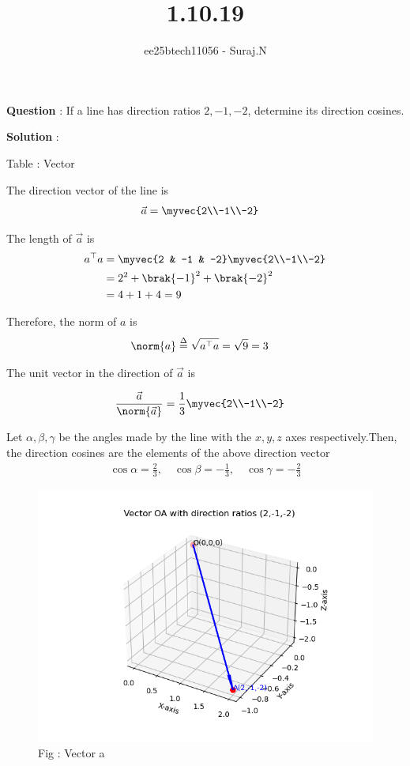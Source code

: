 \documentclass[journal,12pt,onecolumn]{IEEEtran}
\theoremstyle{remark}
\begin{document}
\title{1.10.19}
\author{ee25btech11056 - Suraj.N}
\maketitle
\renewcommand{\thefigure}{\theenumi}
\renewcommand{\thetable}{\theenumi}

\textbf{Question} : If a line has direction ratios $2,-1,-2$, determine its direction cosines. 

\textbf{Solution} : 

\begin{table}[h!]
  \centering
  
  \caption*{Table : Vector}
  \label{1.10.19}
\end{table}

The direction vector of the line is
\begin{align*}
\vec{a} &= \myvec{2\\-1\\-2}
\end{align*}

The length of $\vec{a}$ is
\begin{align*}
a^\top a &= \myvec{2 & -1 & -2}\myvec{2\\-1\\-2} \\
&= 2^2 + \brak{-1}^2 + \brak{-2}^2 \\
&= 4 + 1 + 4 = 9
\end{align*}

Therefore, the norm of $a$ is
\begin{align*}
\norm{a} &\overset{\Delta}{=} \sqrt{a^\top a} = \sqrt{9} = 3
\end{align*} 

The unit vector in the direction of $\vec{a}$ is  

\begin{align*} 
\frac{\vec{a}}{\norm{\vec{a}}}
&= \frac{1}{3}\myvec{2\\-1\\-2}
\end{align*}

Let $\alpha,\beta,\gamma$ be the angles made by the line with the $x,y,z$ axes respectively.Then, the direction cosines are the elements of the above direction vector
\begin{align*}
\cos\alpha = \frac{2}{3}, \quad
\cos\beta = -\frac{1}{3}, \quad
\cos\gamma = -\frac{2}{3}
\end{align*}

\pagebreak

\begin{figure}[h!]
  \centering
  \includegraphics[width=0.9\columnwidth]{figs/fig_vector.png} 
   \caption*{Fig : Vector a}
  \label{Fig1}
\end{figure}
\end{document}
